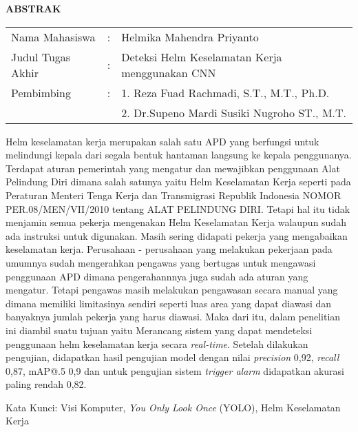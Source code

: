 \begin{center}
  \large\textbf{ABSTRAK}
\end{center}


\vspace{2ex}

\begingroup
  \setlength{\tabcolsep}{0pt}

  \noindent
  \begin{tabularx}{\textwidth}{l >{\centering}m{2em} X}
    Nama Mahasiswa    &:& Helmika Mahendra Priyanto \\

    Judul Tugas Akhir &:&	Deteksi Helm Keselamatan Kerja menggunakan CNN \\

    Pembimbing        &:& 1. Reza Fuad Rachmadi, S.T., M.T., Ph.D. \\
                      & & 2. Dr.Supeno Mardi Susiki Nugroho ST., M.T. \\
  \end{tabularx}
\endgroup

\par Helm keselamatan kerja merupakan salah satu APD  yang berfungsi untuk melindungi kepala dari segala bentuk hantaman langsung ke kepala penggunanya. Terdapat aturan pemerintah yang mengatur dan mewajibkan penggunaan Alat Pelindung Diri dimana salah satunya yaitu Helm Keselamatan Kerja seperti pada Peraturan Menteri Tenga Kerja dan Transmigrasi Republik Indonesia NOMOR PER.08/MEN/VII/2010 tentang ALAT PELINDUNG DIRI. Tetapi hal itu tidak menjamin semua pekerja mengenakan Helm Keselamatan Kerja walaupun sudah ada instruksi untuk digunakan. Masih sering didapati pekerja yang mengabaikan keselamatan kerja. Perusahaan - perusahaan yang melakukan pekerjaan pada umumnya sudah mengerahkan pengawas yang bertugas untuk mengawasi penggunaan APD dimana pengerahannnya juga sudah ada aturan yang mengatur. Tetapi pengawas masih melakukan pengawasan secara manual yang dimana memiliki limitasinya sendiri seperti luas area yang dapat diawasi dan banyaknya jumlah pekerja yang harus diawasi. Maka dari itu, dalam penelitian ini diambil suatu tujuan yaitu Merancang sistem yang dapat mendeteksi penggunaan helm keselamatan kerja secara \emph{real-time}. Setelah dilakukan pengujian, didapatkan hasil pengujian model dengan nilai \emph{precision} 0,92, \emph{recall} 0,87, mAP@.5 0,9 dan untuk pengujian sistem \emph{trigger alarm} didapatkan akurasi paling rendah 0,82.

Kata Kunci: Visi Komputer, \emph{You Only Look Once} (YOLO), Helm Keselamatan Kerja
